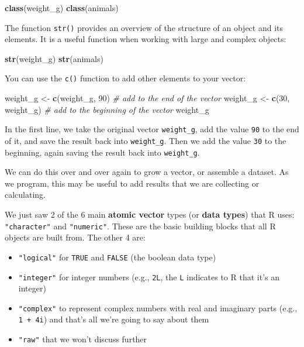 \documentclass[]{book}
\newenvironment{Shaded}{\begin{snugshade}}{\end{snugshade}}
\newcommand{\KeywordTok}[1]{\textcolor[rgb]{0.13,0.29,0.53}{\textbf{{#1}}}}
\newcommand{\DecValTok}[1]{\textcolor[rgb]{0.00,0.00,0.81}{{#1}}}
\newcommand{\StringTok}[1]{\textcolor[rgb]{0.31,0.60,0.02}{{#1}}}
\newcommand{\CommentTok}[1]{\textcolor[rgb]{0.56,0.35,0.01}{\textit{{#1}}}}
\newcommand{\NormalTok}[1]{{#1}}
\providecommand{\tightlist}{%
  \setlength{\itemsep}{0pt}\setlength{\parskip}{0pt}}
\theoremstyle{definition}
\theoremstyle{definition}
\theoremstyle{remark}
\begin{document}
\begin{Shaded}
\begin{Highlighting}[]
\KeywordTok{class}\NormalTok{(weight_g)}
\KeywordTok{class}\NormalTok{(animals)}
\end{Highlighting}
\end{Shaded}

The function \texttt{str()} provides an overview of the structure of an
object and its elements. It is a useful function when working with large
and complex objects:

\begin{Shaded}
\begin{Highlighting}[]
\KeywordTok{str}\NormalTok{(weight_g)}
\KeywordTok{str}\NormalTok{(animals)}
\end{Highlighting}
\end{Shaded}

You can use the \texttt{c()} function to add other elements to your
vector:

\begin{Shaded}
\begin{Highlighting}[]
\NormalTok{weight_g <-}\StringTok{ }\KeywordTok{c}\NormalTok{(weight_g, }\DecValTok{90}\NormalTok{) }\CommentTok{# add to the end of the vector}
\NormalTok{weight_g <-}\StringTok{ }\KeywordTok{c}\NormalTok{(}\DecValTok{30}\NormalTok{, weight_g) }\CommentTok{# add to the beginning of the vector}
\NormalTok{weight_g}
\end{Highlighting}
\end{Shaded}

In the first line, we take the original vector \texttt{weight\_g}, add
the value \texttt{90} to the end of it, and save the result back into
\texttt{weight\_g}. Then we add the value \texttt{30} to the beginning,
again saving the result back into \texttt{weight\_g}.

We can do this over and over again to grow a vector, or assemble a
dataset. As we program, this may be useful to add results that we are
collecting or calculating.

We just saw 2 of the 6 main \textbf{atomic vector} types (or
\textbf{data types}) that R uses: \texttt{"character"} and
\texttt{"numeric"}. These are the basic building blocks that all R
objects are built from. The other 4 are:

\begin{itemize}
\tightlist
\item
  \texttt{"logical"} for \texttt{TRUE} and \texttt{FALSE} (the boolean
  data type)
\item
  \texttt{"integer"} for integer numbers (e.g., \texttt{2L}, the
  \texttt{L} indicates to R that it's an integer)
\item
  \texttt{"complex"} to represent complex numbers with real and
  imaginary parts (e.g., \texttt{1\ +\ 4i}) and that's all we're going
  to say about them
\item
  \texttt{"raw"} that we won't discuss further
\end{itemize}
\end{document}
